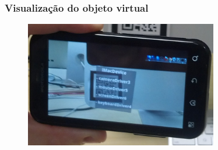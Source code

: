 \documentclass{beamer}
\begin{document}
	
	
	
	
	\begin{frame}
		\frametitle{Visualização do objeto virtual}
		\begin{figure}[htb]
			\begin{center}
					\includegraphics[width=0.75\textwidth]{figuras/objeto_virtual.png}
			\end{center}
		\end{figure}		
	\end{frame}
	
\end{document}

